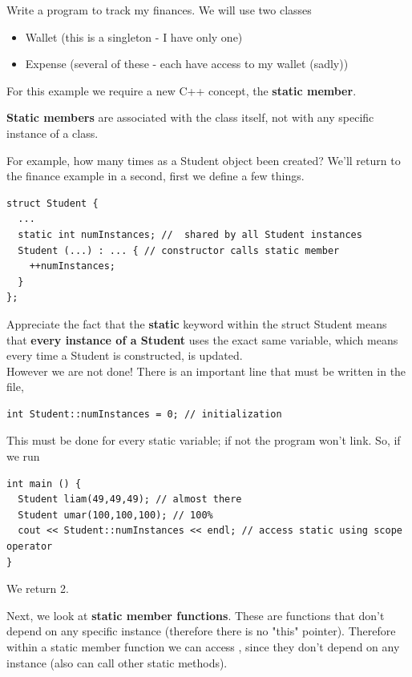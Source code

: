 \documentclass[english, 11pt]{article}
\begin{document}
\begin{exmp}
  Write a program to track my finances. We will use two classes
  \begin{itemize}
    \item Wallet (this is a singleton - I have only one)
    \item Expense (several of these - each have access to my wallet (sadly))
  \end{itemize}
  For this example we require a new C++ concept, the \textbf{static member}. \\

\begin{defn}\label{static member}
\textbf{Static members} are associated with the class itself, not with any specific instance of a class.
\end{defn}

  \begin{exmp}
   For example, how many times as a Student object been created? We'll return to the finance example in a second, first we define a few things.
    \begin{lstlisting}
struct Student {
  ...
  static int numInstances; //  shared by all Student instances
  Student (...) : ... { // constructor calls static member
    ++numInstances;
  }
};
    \end{lstlisting}
    Appreciate the fact that the \textbf{static} keyword within the struct Student means that \textbf{every instance of a Student} uses the exact same variable, which means every time a Student is constructed,  is updated. \\

    However we are not done! There is an important line that must be written in the  file,

    \begin{lstlisting}
int Student::numInstances = 0; // initialization
    \end{lstlisting}

    This must be done for every static variable; if not the program won't link. So, if we run
    \begin{lstlisting}
int main () {
  Student liam(49,49,49); // almost there
  Student umar(100,100,100); // 100%
  cout << Student::numInstances << endl; // access static using scope operator
}
    \end{lstlisting}
    We return 2.
  \end{exmp}

  \begin{defn}\label{static member function}
  Next, we look at \textbf{static member functions}. These are functions that don't depend on any specific instance (therefore there is no "this" pointer). Therefore within a static member function we can access , since they don't depend on any instance (also can call other static methods).
  \end{defn}


\end{exmp}
\end{document}
